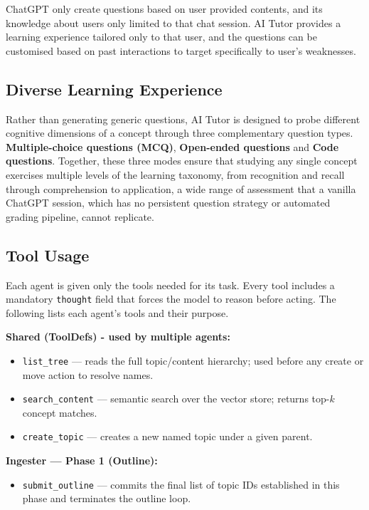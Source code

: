 \documentclass[12pt,a4paper]{article}
\begin{document}
ChatGPT only create questions based on user provided contents, and its knowledge about users only limited to that chat session. AI Tutor provides a learning experience tailored only to that user, and the questions can be customised based on past interactions to target specifically to user's weaknesses.

\subsection{Diverse Learning Experience}

Rather than generating generic questions, AI Tutor is designed to probe different cognitive dimensions of a concept through three complementary question types. \textbf{Multiple-choice questions (MCQ)}, \textbf{Open-ended questions} and \textbf{Code questions}. Together, these three modes ensure that studying any single concept exercises multiple levels of the learning taxonomy, from recognition and recall through comprehension to application, a wide range of assessment that a vanilla ChatGPT session, which has no persistent question strategy or automated grading pipeline, cannot replicate.

\subsection{Tool Usage}

Each agent is given only the tools needed for its task. Every tool includes
a mandatory \texttt{thought} field that forces the model to reason before
acting. The following lists each agent's tools and their purpose.

\textbf{Shared (ToolDefs) - used by multiple agents:}
\begin{itemize}[leftmargin=*, itemsep=2pt]
  \item \texttt{list\_tree} --- reads the full topic/content hierarchy; used before any create or move action to resolve names.
  \item \texttt{search\_content} --- semantic search over the vector store; returns top-$k$ concept matches.
  \item \texttt{create\_topic} --- creates a new named topic under a given parent.
\end{itemize}

\textbf{Ingester --- Phase 1 (Outline):}
\begin{itemize}[leftmargin=*, itemsep=2pt]
  \item \texttt{submit\_outline} --- commits the final list of topic IDs established in this phase and terminates the outline loop.
\end{itemize}
\end{document}
